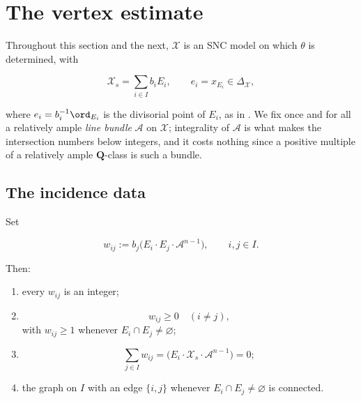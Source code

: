 \section{The vertex estimate}
\label{sec:ch22-vertex}

Throughout this section and the next, \(\mathcal X\) is an SNC model on which
\(\theta\) is determined, with

\[
            \mathcal X_s=\sum_{i\in I}b_iE_i,
            \qquad e_i=x_{E_i}\in\Delta_{\mathcal X},
\tag{22.20}\label{eq:ch22-vertices}
\]

where \(e_i=b_i^{-1}\ord_{E_i}\) is the divisorial point of \(E_i\), as in
.  We fix once and for all a relatively
ample \emph{line bundle} \(\mathcal A\) on \(\mathcal X\); integrality of
\(\mathcal A\) is what makes the intersection numbers below integers, and it
costs nothing since a positive multiple of a relatively ample
\(\mathbf Q\)-class is such a bundle.

\subsection{The incidence data}

\begin{lemma}
\label{lem:ch22-incidence-signs}
Set

\[
 w_{ij}:=b_j\bigl(E_i\cdot E_j\cdot\mathcal A^{n-1}\bigr),
 \qquad i,j\in I .
\tag{22.21}\label{eq:ch22-incidence-weights}
\]

Then:
\begin{enumerate}
\item\label{itm:ch22-inc:integrality} every \(w_{ij}\) is an integer;
\item\label{itm:ch22-inc:offdiag}
\[
 w_{ij}\geq0\quad(i\neq j),
\tag{22.22}\label{eq:ch22-off-diagonal-positive}
\]
with \(w_{ij}\geq1\) whenever \(E_i\cap E_j\neq\varnothing\);
\item\label{itm:ch22-inc:rowsum}
\[
 \sum_{j\in I}w_{ij}
       =\bigl(E_i\cdot\mathcal X_s\cdot\mathcal A^{n-1}\bigr)=0;
\tag{22.23}\label{eq:ch22-row-sum-zero}
\]
\item\label{itm:ch22-inc:connected} the graph on \(I\) with an edge
\(\{i,j\}\) whenever \(E_i\cap E_j\neq\varnothing\) is connected.
\end{enumerate}
\end{lemma}

